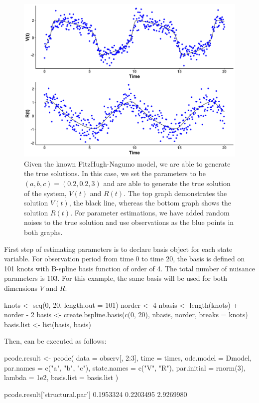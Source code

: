 \begin{figure}[H]
\centering
\includegraphics[width=\textwidth]{FH_observation.png}
\caption{\label{fig:FHN_2d} Given the known FitzHugh-Nagumo model, we are able to generate the true solutions. In this case, we set the parameters to be $(a,b,c) = (0.2,0.2,3)$ and are able to generate the true solution of the system, $V(t)$ and $R(t)$. The top graph demonstrates the solution $V(t)$, the black line, whereas the bottom graph shows the solution $R(t)$. For parameter estimations, we have added random noises to the true solution and use observations as the blue points in both graphs.}
\end{figure}
First step of estimating parameters is to declare basis object for each state variable. For observation period from time 0 to time 20, the basis is defined on 101 knots with B-spline basis function of order of 4. The total number of nuisance parameters is 103. For this example, the same basis will be used for both dimensions $V$ and $R$:
\begin{example*}
knots  <- seq(0, 20, length.out = 101)
norder <- 4
nbasis <- length(knots) + norder - 2
basis  <- create.bspline.basis(c(0, 20), nbasis, norder, breaks = knots)
basis.list <- list(basis, basis)
\end{example*}
Then,  can be executed as follows:
\begin{example*}
pcode.result <- pcode(
  data = observ[, 2:3], time = times, ode.model = Dmodel,
  par.names = c("a", "b", "c"), state.names = c("V", "R"),
  par.initial = rnorm(3), lambda = 1e2,
  basis.list = basis.list
)

pcode.result['structural.par']
0.1953324 0.2203495 2.9269980

\end{example*}



